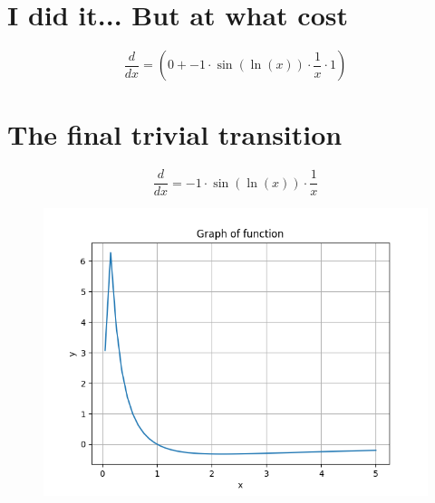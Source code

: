 \documentclass[a4paper, 12pt]{article}
\begin{document}
\section{I did it... But at what cost}\begin{equation*}
    \frac{d}{dx} = ({{0}}+{{{{-1}}\cdot{\sin({\ln({{x}})})}}\cdot{{\frac{{1}}{{x}}}\cdot{{1}}}})
\end{equation*}

\section{The final trivial transition}\begin{equation*}
    \frac{d}{dx} = {{{-1}}\cdot{\sin({\ln({{x}})})}}\cdot{\frac{{1}}{{x}}}
\end{equation*}

\begin{figure}[h!]
        \centering
         \includegraphics[scale=0.5]{./LaTeX/tex_pics/differ.png}
\end{figure}
\end{document}

